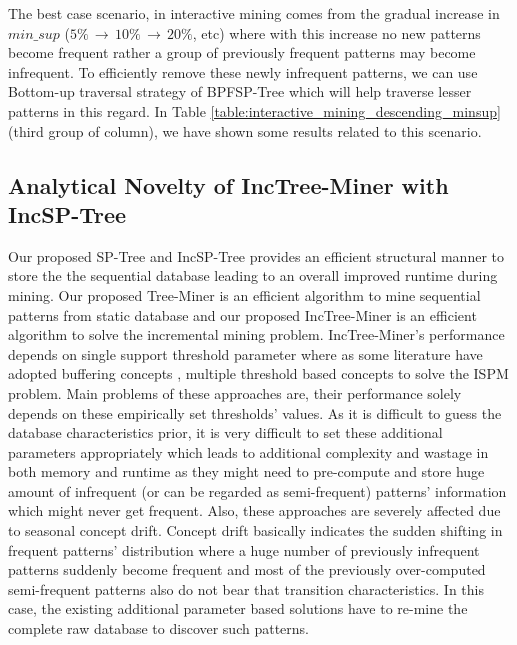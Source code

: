 The best case scenario, in interactive mining comes from the gradual increase in $min\_sup$ ($5\% \,\to\, 10\% \,\to\, 20\% $, etc) where with this increase no new patterns become frequent rather a group of previously frequent patterns may become infrequent. To efficiently remove these newly infrequent patterns, we can use Bottom-up traversal strategy of BPFSP-Tree which will help traverse lesser patterns in this regard. In Table \ref{table:interactive_mining_descending_minsup}(third group of column), we have shown some results related to this scenario.  





\subsection{Analytical Novelty of IncTree-Miner with IncSP-Tree}
Our proposed SP-Tree and IncSP-Tree provides an efficient structural manner to store the the sequential database leading to an overall improved runtime during mining. Our proposed Tree-Miner is an efficient algorithm to mine sequential patterns from static database and our proposed IncTree-Miner is an efficient algorithm to solve the incremental mining problem. IncTree-Miner's performance depends on single support threshold parameter where as some literature have adopted buffering concepts \cite{cheng2004incspan}, multiple threshold based concepts \cite{lin2015incrementally} to solve the ISPM problem. Main problems of these approaches are, their performance solely depends on these empirically set thresholds' values. As it is difficult to guess the database characteristics prior, it is very difficult to set these additional parameters appropriately which leads to additional complexity and wastage in both memory and runtime as they might need to pre-compute and store huge amount of infrequent (or can be regarded as semi-frequent) patterns' information which might never get frequent. Also, these approaches are severely affected due to seasonal concept drift. Concept drift basically indicates the sudden shifting in frequent patterns' distribution where a huge number of previously infrequent patterns suddenly become frequent and most of the previously over-computed semi-frequent patterns also do not bear that transition characteristics. In this case, the existing additional parameter based solutions have to re-mine the complete raw database to discover such patterns.   


